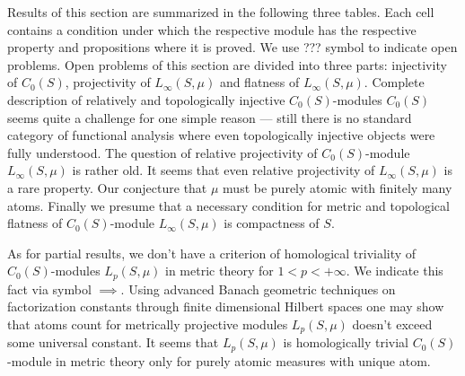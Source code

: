 Results of this section are summarized in the following three tables. Each cell contains a condition under which the respective module has the respective property and propositions where it is proved. We use ??? symbol to indicate open problems. Open problems of this section are divided into three parts: injectivity of $C_0(S)$, projectivity of $L_\infty(S,\mu)$ and flatness of $L_\infty(S,\mu)$. Complete description of relatively and topologically injective $C_0(S)$-modules $C_0(S)$ seems quite a challenge for one simple reason --- still there is no standard category of functional analysis where even topologically injective objects were fully understood. The question of relative projectivity of $C_0(S)$-module $L_\infty(S,\mu)$ is rather old. It seems that even relative projectivity of $L_\infty(S,\mu)$ is a rare property. Our conjecture that $\mu$ must be purely atomic with finitely many atoms. Finally we presume that a necessary condition for metric and topological flatness of $C_0(S)$-module $L_\infty(S,\mu)$ is compactness of $S$.

As for partial results, we don't have a criterion of homological triviality of $C_0(S)$-modules $L_p(S,\mu)$ in metric theory for $1<p<+\infty$. We indicate this fact via symbol $\implies$. Using advanced Banach geometric techniques on factorization constants through finite dimensional Hilbert spaces one may show that atoms count for metrically projective modules $L_p(S,\mu)$ doesn't exceed some universal constant. It seems that $L_p(S,\mu)$ is homologically trivial $C_0(S)$-module in metric theory only for purely atomic measures with unique atom. 

